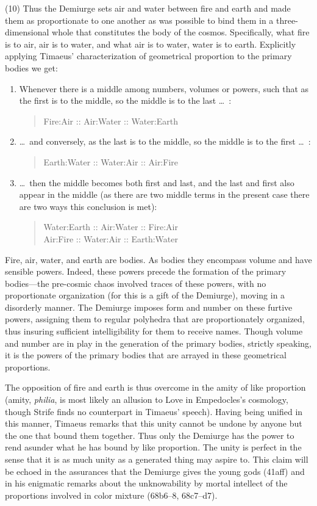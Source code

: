 (10) Thus the Demiurge sets air and water between fire and earth and made them as proportionate to one another as was possible to bind them in a three-dimensional whole that constitutes the body of the cosmos. Specifically, what fire is to air, air is to water, and what air is to water, water is to earth. Explicitly applying Timaeus' characterization of geometrical proportion to the primary bodies we get:
\begin{enumerate}[(1)]
	\item Whenever there is a middle among numbers, volumes or powers, such that as the first is to the middle, so the middle is to the last \ldots\ :
	\begin{quote}
		Fire:Air :: Air:Water :: Water:Earth
	\end{quote}
	\item \ldots\ and conversely, as the last is to the middle, so the middle is to the first \dots\ :
	\begin{quote}
		Earth:Water :: Water:Air :: Air:Fire
	\end{quote}
	\item \ldots\ then the middle becomes both first and last, and the last and first also appear in the middle (as there are two middle terms in the present case there are two ways this conclusion is met):
	\begin{quote}
		Water:Earth :: Air:Water :: Fire:Air\\
		Air:Fire :: Water:Air :: Earth:Water
	\end{quote}
\end{enumerate}
Fire, air, water, and earth are bodies. As bodies they encompass volume and have sensible powers. Indeed, these powers precede the formation of the primary bodies---the pre-cosmic chaos involved traces of these powers, with no proportionate organization (for this is a gift of the Demiurge), moving in a disorderly manner. The Demiurge imposes form and number on these furtive powers, assigning them to regular polyhedra that are proportionately organized, thus insuring sufficient intelligibility for them to receive names. Though volume and number are in play in the generation of the primary bodies, strictly speaking, it is the powers of the primary bodies that are arrayed in these geometrical proportions. 

The opposition of fire and earth is thus overcome in the amity of like proportion (amity, \emph{philia}, is most likely an allusion to Love in Empedocles's cosmology, though Strife finds no counterpart in Timaeus' speech). Having being unified in this manner, Timaeus remarks that this unity cannot be undone by anyone but the one that bound them together. Thus only the Demiurge has the power to rend asunder what he has bound by like proportion. The unity is perfect in the sense that it is as much unity as a generated thing may aspire to. This claim will be echoed in the assurances that the Demiurge gives the young gods (41aff) and in his enigmatic remarks about the unknowability by mortal intellect of the proportions involved in color mixture (68b6–8, 68c7–d7).

